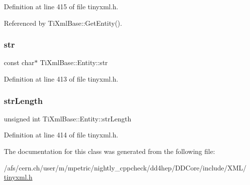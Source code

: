 Definition at line 415 of file tinyxml.\+h.



Referenced by Ti\+Xml\+Base\+::\+Get\+Entity().

\hypertarget{struct_ti_xml_base_1_1_entity_ab721b5d4f7ed144ffd215947b38258b7}{}\label{struct_ti_xml_base_1_1_entity_ab721b5d4f7ed144ffd215947b38258b7} 
\subsubsection{\texorpdfstring{str}{str}}
{\footnotesize\ttfamily const char$\ast$ Ti\+Xml\+Base\+::\+Entity\+::str}



Definition at line 413 of file tinyxml.\+h.

\hypertarget{struct_ti_xml_base_1_1_entity_a22e8d820894d3360b01fed110badb876}{}\label{struct_ti_xml_base_1_1_entity_a22e8d820894d3360b01fed110badb876} 
\subsubsection{\texorpdfstring{str\+Length}{strLength}}
{\footnotesize\ttfamily unsigned int Ti\+Xml\+Base\+::\+Entity\+::str\+Length}



Definition at line 414 of file tinyxml.\+h.



The documentation for this class was generated from the following file\+:\begin{DoxyCompactItemize}
\item 
/afs/cern.\+ch/user/m/mpetric/nightly\+\_\+cppcheck/dd4hep/\+D\+D\+Core/include/\+X\+M\+L/\hyperlink{tinyxml_8h}{tinyxml.\+h}\end{DoxyCompactItemize}

